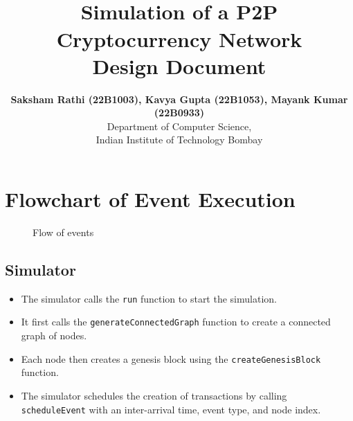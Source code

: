\documentclass[a4paper,12pt]{article}
\title{\cooltitle{CS765 Project Part-1} \\
\LARGE \textbf{Simulation of a P2P Cryptocurrency Network} \\
Design Document}
\author{{\bf Saksham Rathi (22B1003), Kavya Gupta (22B1053), Mayank Kumar (22B0933)} \\
\small Department of Computer Science, \\
Indian Institute of Technology Bombay \\}
\date{}
\newenvironment{solution}[2][]{%
\begin{mdframed}[linecolor=blue!80, linewidth=2pt, roundcorner=10pt, backgroundcolor=yellow!10!white, skipabove=12pt, skipbelow=12pt]%
	\textbf{\large #2}
	\par\noindent\rule{\textwidth}{0.4pt}
}{
\end{mdframed}
}
\begin{document}
\maketitle


\newpage
\section*{Flowchart of Event Execution}
\begin{figure}[h]
    \centering
    \caption{Flow of events}
\end{figure}

\subsection*{Simulator}

\begin{itemize}
	\item The simulator calls the \texttt{run} function to start the simulation.
	\item It first calls the \texttt{generateConnectedGraph} function to create a connected graph of nodes.
	\item Each node then creates a genesis block using the \texttt{createGenesisBlock} function.
	\item The simulator schedules the creation of transactions by calling \texttt{scheduleEvent} with an inter-arrival time, event type, and node index.
\end{itemize}
\end{document}
